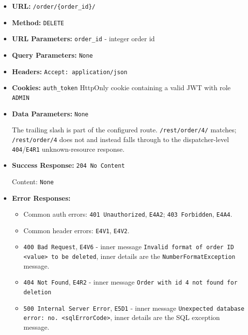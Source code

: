 \begin{itemize}[nosep]
\item \textbf{URL:} \texttt{/order/\{order\_id\}/}

\item \textbf{Method:} \texttt{DELETE}

\item \textbf{URL Parameters:} \texttt{order\_id} - integer order id

\item \textbf{Query Parameters:} \texttt{None}

\item \textbf{Headers:} \texttt{Accept: application/json}

\item \textbf{Cookies:} \texttt{auth\_token} HttpOnly cookie containing a valid JWT with role \texttt{ADMIN}

\item \textbf{Data Parameters:} \texttt{None}

The trailing slash is part of the configured route. \texttt{/rest/order/4/} matches; \texttt{/rest/order/4} does not and instead falls through to the dispatcher-level \texttt{404}/\texttt{E4R1} unknown-resource response.

\item \textbf{Success Response:} \texttt{204 No Content}

Content: \texttt{None}

\item \textbf{Error Responses:}

\begin{itemize}[nosep]
\item Common auth errors: \texttt{401 Unauthorized}, \texttt{E4A2}; \texttt{403 Forbidden}, \texttt{E4A4}.
\item Common header errors: \texttt{E4V1}, \texttt{E4V2}.
\item \texttt{400 Bad Request}, \texttt{E4V6} - inner message \texttt{Invalid format of order ID <value> to be deleted}, inner details are the \texttt{NumberFormatException} message.
\item \texttt{404 Not Found}, \texttt{E4R2} - inner message \texttt{Order with id 4 not found for deletion}
\item \texttt{500 Internal Server Error}, \texttt{E5D1} - inner message \texttt{Unexpected database error: no. <sqlErrorCode>}, inner details are the SQL exception message.
\end{itemize}

\end{itemize}

